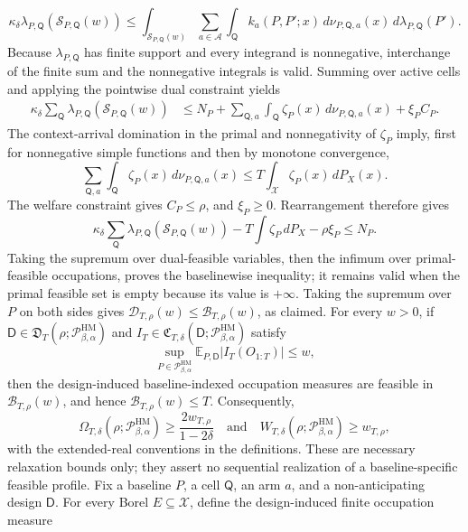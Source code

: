 \[
\kappa_\delta\lambda_{P,\mathsf Q}(\mathcal S_{P,\mathsf Q}(w))
\le
\int_{\mathcal S_{P,\mathsf Q}(w)}
\sum_{a\in\mathcal A}\int_{\mathsf Q}k_a(P,P';x)
\,d\nu_{P,\mathsf Q,a}(x)\,d\lambda_{P,\mathsf Q}(P').
\]
Because \(\lambda_{P,\mathsf Q}\) has finite support and every integrand is nonnegative, interchange of the finite sum and the nonnegative integrals is valid.  Summing over active cells and applying the pointwise dual constraint yields
\[
\begin{split}
\kappa_\delta\sum_{\mathsf Q}
\lambda_{P,\mathsf Q}(\mathcal S_{P,\mathsf Q}(w))
&\le N_P
+\sum_{\mathsf Q,a}\int_{\mathsf Q}\zeta_P(x)
\,d\nu_{P,\mathsf Q,a}(x)+\xi_PC_P.
\end{split}
\]
The context-arrival domination in the primal and nonnegativity of \(\zeta_P\) imply, first for nonnegative simple functions and then by monotone convergence,
\[
\sum_{\mathsf Q,a}\int_{\mathsf Q}\zeta_P(x)
\,d\nu_{P,\mathsf Q,a}(x)
\le T\int_{\mathcal X}\zeta_P(x)\,dP_X(x).
\]
The welfare constraint gives \(C_P\le\rho\), and \(\xi_P\ge0\).  Rearrangement therefore gives
\[
\kappa_\delta\sum_{\mathsf Q}
\lambda_{P,\mathsf Q}(\mathcal S_{P,\mathsf Q}(w))
-T\int\zeta_P\,dP_X-\rho\xi_P\le N_P.
\]
Taking the supremum over dual-feasible variables, then the infimum over primal-feasible occupations, proves the baselinewise inequality; it remains valid when the primal feasible set is empty because its value is \(+\infty\).  Taking the supremum over \(P\) on both sides gives \(\mathcal D_{T,\rho}(w)\le\mathcal B_{T,\rho}(w)\), as claimed.
For every \(w>0\), if \(\mathsf D\in\mathfrak D_T(\rho;\mathcal P_{\beta,\alpha}^{\mathrm{HM}})\) and \(I_T\in\mathfrak C_{T,\delta}(\mathsf D;\mathcal P_{\beta,\alpha}^{\mathrm{HM}})\) satisfy
\[
\sup_{P\in\mathcal P_{\beta,\alpha}^{\mathrm{HM}}}
\mathbb E_{P,\mathsf D}|I_T(O_{1:T})|\le w,
\]
then the design-induced baseline-indexed occupation measures are feasible in \(\mathcal B_{T,\rho}(w)\), and hence \(\mathcal B_{T,\rho}(w)\le T\).  Consequently,
\[
\Omega_{T,\delta}(\rho;\mathcal P_{\beta,\alpha}^{\mathrm{HM}})
\ge\frac{2w_{T,\rho}}{1-2\delta}
\quad\text{and}\quad
W_{T,\delta}(\rho;\mathcal P_{\beta,\alpha}^{\mathrm{HM}})\ge w_{T,\rho},
\]
with the extended-real conventions in the definitions.  These are necessary relaxation bounds only; they assert no sequential realization of a baseline-specific feasible profile.
Fix a baseline \(P\), a cell \(\mathsf Q\), an arm \(a\), and a non-anticipating design \(\mathsf D\).  For every Borel \(E\subseteq\mathcal X\), define the design-induced finite occupation measure
